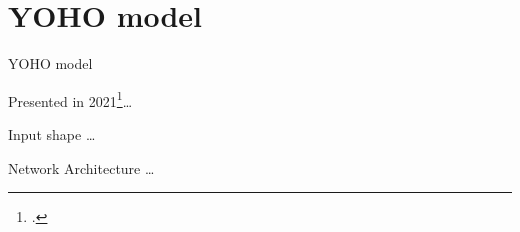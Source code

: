 

\section[YOHO model]{YOHO model}

	\begin{frame}{YOHO model}
			
		Presented in 2021\footcite{Venkatesh_2022}\dots
		
		\note{
			\dots			
		}		
		
	\end{frame}
	
	\begin{frame}{Input shape}
		\dots
		
		\note{
			\dots
		}
	\end{frame}
	
	
	\begin{frame}{Network Architecture}
		\dots
		
		\note{
			\dots
		}
	\end{frame}
	
